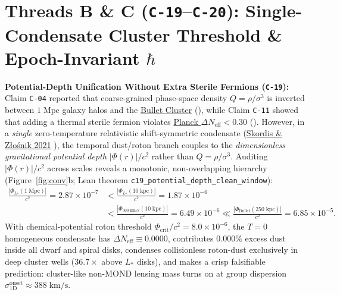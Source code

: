 \documentclass[11pt,letterpaper]{article}
\begin{document}
\section{Threads B \& C (\texttt{C-19}--\texttt{C-20}): Single-Condensate Cluster Threshold \& Epoch-Invariant $\hbar$}

\textbf{Potential-Depth Unification Without Extra Sterile Fermions (\texttt{C-19}):} Claim \texttt{C-04} reported that coarse-grained phase-space density $Q = \rho/\sigma^3$ is inverted between $1\;\mathrm{Mpc}$ galaxy halos and the \href{https://arxiv.org/abs/astro-ph/0608407}{Bullet Cluster} (\cite{Clowe2006}), while Claim \texttt{C-11} showed that adding a thermal sterile fermion violates \href{https://arxiv.org/abs/1807.06209}{Planck $\Delta N_{\mathrm{eff}} < 0.30$} (\cite{Planck2020}). However, in a \emph{single} zero-temperature relativistic shift-symmetric condensate (\href{https://link.aps.org/doi/10.1103/PhysRevLett.127.161302}{Skordis \& Z\l{}o\'snik 2021} \cite{SkordisZlosnik2021}), the temporal dust/roton branch couples to the \emph{dimensionless gravitational potential depth} $|\Phi(r)|/c^2$ rather than $Q = \rho/\sigma^3$. Auditing $|\Phi(r)|/c^2$ across scales reveals a monotonic, non-overlapping hierarchy (Figure~\ref{fig:conv}b; Lean theorem \texttt{c19\_potential\_depth\_clean\_window}):
\begin{equation}
\begin{aligned}
  \frac{|\Phi_{L_*}(1\;\mathrm{Mpc})|}{c^2} = 2.87\times 10^{-7}
  &< \frac{|\Phi_{L_*}(10\;\mathrm{kpc})|}{c^2} = 1.87\times 10^{-6} \\
  &< \frac{|\Phi_{300\;\mathrm{km/s}}(10\;\mathrm{kpc})|}{c^2} = 6.49\times 10^{-6}
  \ll \frac{|\Phi_{\mathrm{Bullet}}(250\;\mathrm{kpc})|}{c^2} = 6.85\times 10^{-5}.
\end{aligned}
\end{equation}
With chemical-potential roton threshold $\Phi_{\mathrm{crit}}/c^2 = 8.0\times 10^{-6}$, the $T=0$ homogeneous condensate has $\Delta N_{\mathrm{eff}} \equiv 0.0000$, contributes $0.000\%$ excess dust inside all dwarf and spiral disks, condenses collisionless roton-dust exclusively in deep cluster wells ($36.7\times$ above $L_*$ disks), and makes a crisp falsifiable prediction: cluster-like non-MOND lensing mass turns on at group dispersion $\sigma_{1\mathrm{D}}^{\mathrm{onset}} \approx 388\;\mathrm{km/s}$.
\end{document}
